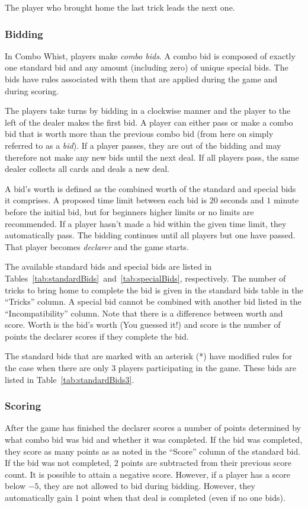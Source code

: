 \documentclass[a4paper]{article}
\begin{document}
{{{				 The player who brought home the last trick leads the next one.
			}

			\subsubsection{Bidding}{\label{sec:bidding}
				In Combo Whist, players make \emph{combo bids}. A combo bid is composed of exactly one standard bid and any amount (including zero) of unique special bids. The bids have rules associated with them that are applied during the game and during scoring.

				The players take turns by bidding in a clockwise manner and the player to the left of the dealer makes the first bid. A player can either pass or make a combo bid that is worth more than the previous combo bid (from here on simply referred to as a \emph{bid}). If a player passes, they are out of the bidding and may therefore not make any new bids until the next deal. If all players pass, the same dealer collects all cards and deals a new deal.

				A bid's worth is defined as the combined worth of the standard and special bids it comprises. A proposed time limit between each bid is $20$ seconds and $1$ minute before the initial bid, but for beginners higher limits or no limits are recommended. If a player hasn't made a bid within the given time limit, they automatically pass. The bidding continues until all players but one have passed. That player becomes \emph{declarer} and the game starts.

				The available standard bids and special bids are listed in Tables~\ref{tab:standardBids}~and~\ref{tab:specialBids}, respectively. The number of tricks to bring home to complete the bid is given in the standard bids table in the ``Tricks'' column. A special bid cannot be combined with another bid listed in the ``Incompatibility'' column. Note that there is a difference between worth and score. Worth is the bid's worth (You guessed it!) and score is the number of points the declarer scores if they complete the bid.

				The standard bids that are marked with an asterisk (*) have modified rules for the case when there are only $3$ players participating in the game. These bids are listed in Table~\ref{tab:standardBids3}.

			}

			\subsubsection{Scoring}{%
				After the game has finished the declarer scores a number of points determined by what combo bid was bid and whether it was completed. If the bid was completed, they score as many points as as noted in the ``Score'' column of the standard bid. If the bid was not completed, $2$ points are subtracted from their previous score count. It is possible to attain a negative score. However, if a player has a score below $-5$, they are not allowed to bid during bidding. However, they automatically gain 1 point when that deal is completed (even if no one bids).
			}

}}
\end{document}
